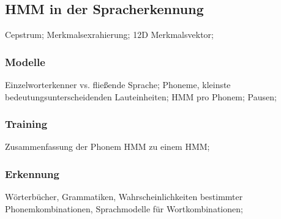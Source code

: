 \documentclass[german,color,6pt]{latex4ei/latex4ei_sheet}
\begin{document}
\columnbreak

\begin{sectionbox}
	\subsection{HMM in der Spracherkennung}
	\begin{symbolbox}
	Cepstrum;  Merkmalsexrahierung; 12D Merkmalsvektor;
	\end{symbolbox}

	\subsubsection{Modelle}
	Einzelworterkenner vs. fließende Sprache; Phoneme, kleinste bedeutungsunterscheidenden Lauteinheiten; HMM pro Phonem; Pausen;

	\subsubsection{Training}
	Zusammenfassung der Phonem HMM zu einem HMM;

	\subsubsection{Erkennung}
	Wörterbücher, Grammatiken, Wahrscheinlichkeiten bestimmter Phonemkombinationen, Sprachmodelle für Wortkombinationen;
\end{sectionbox}
\end{document}
